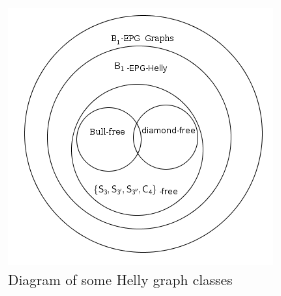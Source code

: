  \begin{figure}[htb]	
 \center%
 \includegraphics[width=7cm]{./img/diagramS3Free.png}
 \caption{Diagram of some Helly graph classes}
\label{fig:diagramS3Free}
\end{figure}  
 